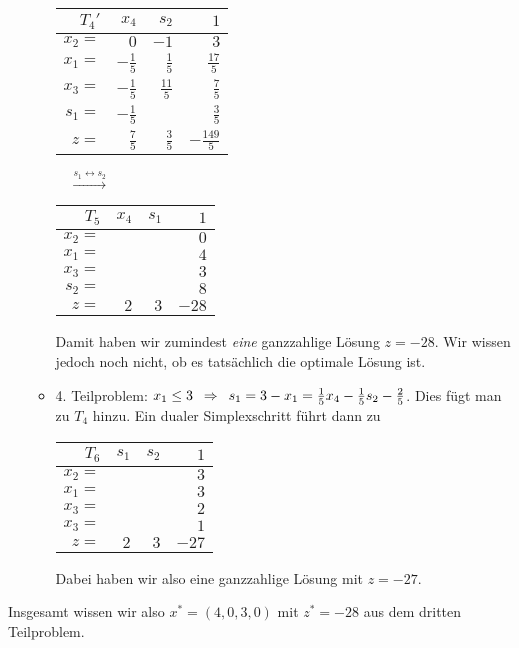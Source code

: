 \begin{beispiel}
\begin{itemize}[leftmargin=*]
\begin{itemize}
			\begin{center}
				\begin{tabular}{r|rr|r}
					$T_4'$ & $x_4$ & $s_2$ & $1$ \\ \hline
					$x_2 = $ & $0$ & $-1$ & $3$ \\
					$x_1 = $ & $-\frac{1}{5}$ & $\frac{1}{5}$ & $\frac{17}{5}$ \\
					$x_3 = $ & $-\frac{1}{5}$ & $\frac{11}{5}$ & $\frac{7}{5}$ \\
					$s_1 = $ & $-\frac{1}{5}$ & \fbox{$\frac{1}{5}$} & $\frac{3}{5}$ \\ \hline
					$z = $   & $\frac{7}{5}$ & $\frac{3}{5}$ & $-\frac{149}{5}$
				\end{tabular}
				$\quad \overset{s_1 \leftrightarrow s_2}{\longrightarrow} \quad$	
				\begin{tabular}{r|rr|r}
					$T_5$ & $x_4$ & $s_1$ & $1$ \\ \hline
					$x_2 = $ &  &  & $0$ \\
					$x_1 = $ &  &  & $4$ \\
					$x_3 = $ &  &  & $3$ \\
					$s_2 = $ &  &  & $8$ \\ \hline
					$z = $   & $2$ & $3$ & $-28$
				\end{tabular}
			\end{center}
			Damit haben wir zumindest \textit{eine} ganzzahlige Lösung $z = -28$. Wir wissen jedoch noch nicht, ob es tatsächlich die optimale Lösung ist.
			\item 4. Teilproblem: $x_1 \le 3 \enskip \Rightarrow \enskip s_1 = 3-x_1 = \frac{1}{5} x_4 - \frac{1}{5} s_2 - \frac{2}{5}$. Dies fügt man zu $T_4$ hinzu. Ein dualer Simplexschritt führt dann zu
			\begin{center}
				\begin{tabular}{r|rr|r}
					$T_6$ & $s_1$ & $s_2$ & $1$ \\ \hline
					$x_2 = $ &  &  & $3$ \\
					$x_1 = $ &  &  & $3$ \\
					$x_3 = $ &  &  & $2$ \\
					$x_3 = $ &  &  & $1$ \\ \hline
					$z = $   & $2$ & $3$ & $-27$
				\end{tabular}
			\end{center}
			Dabei haben wir also eine ganzzahlige Lösung mit $z = -27$.
		\end{itemize}
	\end{itemize}
	Insgesamt wissen wir also $x^\ast = (4,0,3,0)$ mit $z^\ast = -28$ aus dem dritten Teilproblem.
\end{beispiel}


